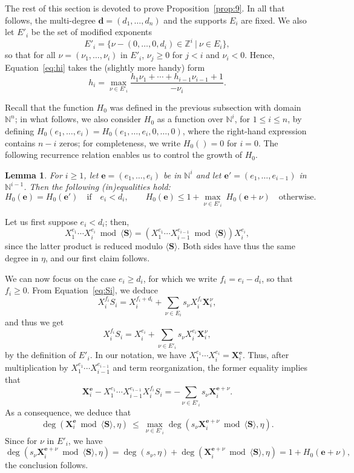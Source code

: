 \documentclass[amsthm]{elsart}
\def\d {\ensuremath{\mathbf{d}}}
\def\e {\ensuremath{\mathbf{e}}}
\def\N {\ensuremath{\mathbb{N}}}
\def\S {\ensuremath{\mathbf{S}}}
\def\Z {\ensuremath{\mathbb{Z}}}
\def\X {\ensuremath{\mathbf{X}}}
\theoremstyle{plain}
\newtheorem{Lemma}{Lemma}
\begin{document}
\medskip

The rest of this section is devoted to prove Proposition~\ref{prop:9}.
In all that follows, the multi-degree $\d=(d_1,\dots,d_n)$ and the
supports $E_i$ are fixed. We also let $E'_i$ be the set of modified
exponents
$$E'_i = \{ \nu - (0,\dots,0,d_i) \in \Z^i \ | \ \nu \in E_i\},$$
so that for all $\nu=(\nu_1,\dots,\nu_i)$ in $E'_i$, $\nu_j \ge 0$
for $j < i$ and $\nu_i < 0$.  Hence, Equation~\eqref{eq:hi} takes the
(slightly more handy) form 
\begin{equation}
h_i = \max_{\nu \in E'_i}  \frac{h_1 \nu_{1} + \cdots + h_{i-1} \nu_{i-1} + 1}{-\nu_{i}}.
\end{equation}


Recall that the function $H_0$ was defined
in the previous subsection with domain $\N^n$; in what follows, we
also consider $H_0$ as a function over $\N^i$, for $1 \le i \le n$, by
defining $H_0(e_1,\dots,e_i) = H_0(e_1,\dots,e_i,0,\dots,0)$, where
the right-hand expression contains $n-i$ zeros; for completeness, we
write $H_0()=0$ for $i=0$.  The following recurrence relation enables
us to control the growth of $H_0$.
\begin{Lemma}\label{lemma:10}
  For $i\ge 1$, let $\e=(e_1,\dots,e_i)$ be in $\N^i$ and let
  $\e'=(e_1,\dots,e_{i-1})$ in $\N^{i-1}$. Then the following
  (in)equalities hold:
$$ H_0(\e) = H_0(\e') \quad\text{if}\quad e_i < d_i,\qquad
H_0(\e) \le 1 + \max_{\nu \in E'_i}\  H_0(\e + \nu)\quad\text{otherwise.}$$
\end{Lemma}
\begin{pf}
Let us first suppose $e_i < d_i$; then, 
$$X_1^{e_1}\cdots X_i^{e_i} \bmod \langle \S \rangle= (X_1^{e_1}\cdots
X_{i-1}^{e_{i-1}} \bmod \langle \S \rangle) X_i^{e_i},$$ since the
latter product is reduced modulo $\langle \S \rangle$. Both sides have
thus the same degree in $\eta$, and our first claim follows.

We can now focus on the case $e_i \ge d_i$, for which we write $f_i =
e_i - d_i$, so that $f_i \ge 0$. From Equation~\eqref{eq:Si},
we deduce
$$X_i^{f_i} S_i =
X_i^{f_i+d_i} + \sum_{\nu \in E_i} s_\nu X_i^{f_i} \X_i^\nu,$$
and thus we get
$$X_i^{f_i} S_i = X_i^{e_i} + \sum_{\nu \in E'_i} s_\nu X_i^{e_i} \X_i^\nu,$$
by the definition of $E'_i$. In our notation, we have
$X_1^{e_1}\cdots X_{i}^{e_{i}}=\X_i^\e$. Thus, after multiplication by
$X_1^{e_1}\cdots X_{i-1}^{e_{i-1}}$ and term reorganization, the former
equality implies that
$$\X_i^\e - X_1^{e_1}\cdots X_{i-1}^{e_{i-1}} X_i^{f_i} S_i 
= -\sum_{\nu \in E'_i} s_\nu \X_i^{\e+\nu}.$$
As a consequence, we deduce that
$$\deg(\X_i^\e \bmod \langle \S \rangle, \eta)
\ \le\ \max_{\nu \in E'_i} \deg(s_\nu \X_i^{\e+\nu} \bmod \langle \S \rangle, \eta).$$
Since for $\nu$ in $E'_i$, we have
$$\deg(s_\nu \X_i^{\e+\nu} \bmod \langle \S \rangle, \eta)
=\deg(s_\nu,\eta) + \deg(\X_i^{\e+\nu} \bmod \langle \S \rangle, \eta)
=1+H_0(\e+\nu),$$
the conclusion follows. 
\end{pf}
\end{document}
